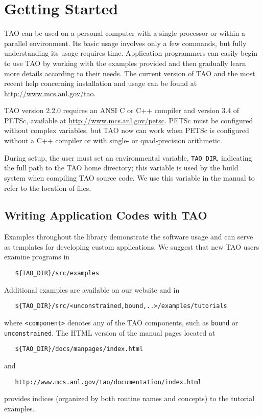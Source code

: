 \chapter{Getting Started}
\label{chapter:intro_tao}

TAO can be used on a personal
computer with a single processor or within a parallel environment.  
Its basic usage involves only a few commands, but fully 
understanding its usage requires time.
Application programmers can easily begin to use TAO by working with 
the examples provided and then gradually learn more details according to
their needs.  The current version of TAO and the most recent help 
concerning installation and usage can be found at  
\url{http://www.mcs.anl.gov/tao}.

TAO version 2.2.0 requires an ANSI C or C++ compiler and version 3.4 of PETSc, 
available at \url{http://www.mcs.anl.gov/petsc}.  PETSc must be configured 
without complex variables, but TAO now can work when PETSc 
is configured without a C++ compiler or with single- or quad-precision 
arithmetic.

During setup, the user must set an environmental variable, 
\texttt{TAO\_DIR}, indicating the full path to 
the TAO home directory; this variable is used by the build
system when compiling TAO source code.  We use this variable in the
manual to refer to the location of files.

\section{Writing Application Codes with TAO}

Examples throughout the library demonstrate the software usage and
can serve as templates for developing custom applications.  We suggest
that new TAO users examine programs in
\begin{verbatim}
   ${TAO_DIR}/src/examples
\end{verbatim} %
\noindent
Additional examples are available on our website and in
\begin{verbatim}
   ${TAO_DIR}/src/<unconstrained,bound,..>/examples/tutorials
\end{verbatim} 
\noindent
where \texttt{<component>}
denotes any of the TAO components, such as 
\texttt{bound} or \texttt{unconstrained}.
The HTML version of the manual pages located at
\begin{verbatim}
   ${TAO_DIR}/docs/manpages/index.html
\end{verbatim} %
\noindent
and
\begin{verbatim}
   http://www.mcs.anl.gov/tao/documentation/index.html
\end{verbatim}
\noindent
provides indices (organized by both routine names and concepts) to the
tutorial examples.

